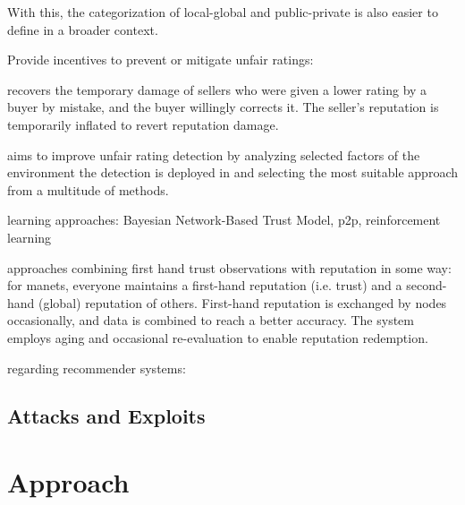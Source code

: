\documentclass[%
    ]{\PathToTumTemplate/thesis/tum_thesis}
\begin{document}
With this, the categorization of local-global and public-private is also easier to define in a broader context.





Provide incentives to prevent or mitigate unfair ratings: 
\cite{thakur_reputation_2019}
\cite{jurca_minimum_2006}

\cite{liu_reputation_2015} recovers the temporary damage of sellers who were given a lower rating by a buyer by mistake, and the buyer willingly corrects it. The seller's reputation is temporarily inflated to revert reputation damage.

\cite{wan_context-aware_2012} aims to improve unfair rating detection by analyzing selected factors of the environment the detection is deployed in and selecting the most suitable approach from a multitude of methods. 

learning approaches:
\cite{khoshkbarchi_coping_2017}
\cite{wang_bayesian_2003} Bayesian Network-Based Trust Model, p2p, reinforcement learning
\cite{yazidi_solving_2017}

approaches combining first hand trust observations with reputation in some way:
\cite{boudec_robust_2003} for manets, everyone maintains a first-hand reputation (i.e. trust) and a second-hand (global) reputation of others. First-hand reputation is exchanged by nodes occasionally, and data is combined to reach a better accuracy. The system employs aging and occasional re-evaluation to enable reputation redemption.
\cite{huynh_handling_2005}

regarding recommender systems:
\cite{hutchison_combining_2013}

\section{Attacks and Exploits}\label{sec:sota_attacks}






\chapter{Approach}\label{chap:approach}
\end{document}
